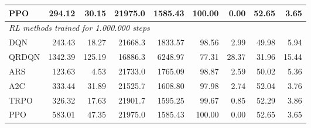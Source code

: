 \begin{samepage}
\begin{center}
\begin{tabular}{l|rr|rr|rr|rr}
    PPO          &   294.12 &    30.15 &    21975.0 &    1585.43 &  100.00 &    0.00 &   52.65 &    3.65 \\
    \midrule
    \multicolumn{9}{l}{\textit{RL methods trained for 1.000.000 steps}} \\
    \midrule
    DQN          &   243.43 &    18.27 &    21668.3 &    1833.57 &   98.56 &    2.99 &   49.98 &    5.94 \\
    QRDQN        &  1342.39 &   125.19 &    16886.3 &    6248.97 &   77.31 &   28.37 &   31.96 &   15.44 \\
    ARS          &   123.63 &     4.53 &    21733.0 &    1765.09 &   98.87 &    2.59 &   50.02 &    5.36 \\
    A2C          &   333.44 &    31.89 &    21525.7 &    1608.80 &   97.98 &    2.74 &   52.04 &    3.76 \\
    TRPO         &   326.32 &    17.63 &    21901.7 &    1595.25 &   99.67 &    0.85 &   52.29 &    3.86 \\
    PPO          &   583.01 &    47.35 &    21975.0 &    1585.43 &  100.00 &    0.00 &   52.65 &    3.65 \\
    \bottomrule
  \end{tabular}
\end{center}
\end{samepage}

